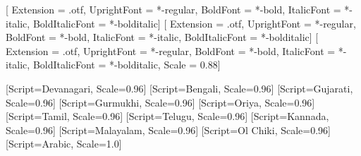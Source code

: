 
\usepackage[a4paper,
            left=1.25in, right=1.0in, top=0.75in, bottom=0.75in,
            includehead, includefoot, headsep=10pt, footskip=22pt]{geometry}

\usepackage{fontspec}

\setmainfont{texgyretermes}[
  Extension      = .otf,
  UprightFont    = *-regular,
  BoldFont       = *-bold,
  ItalicFont     = *-italic,
  BoldItalicFont = *-bolditalic]
\setsansfont{texgyreheros}[
  Extension      = .otf,
  UprightFont    = *-regular,
  BoldFont       = *-bold,
  ItalicFont     = *-italic,
  BoldItalicFont = *-bolditalic]
\setmonofont{texgyrecursor}[
  Extension      = .otf,
  UprightFont    = *-regular,
  BoldFont       = *-bold,
  ItalicFont     = *-italic,
  BoldItalicFont = *-bolditalic,
  Scale          = 0.88]

\newfontfamily{}[Script=Devanagari, Scale=0.96]
\newfontfamily{}[Script=Bengali, Scale=0.96]
\newfontfamily{}[Script=Gujarati, Scale=0.96]
\newfontfamily{}[Script=Gurmukhi, Scale=0.96]
\newfontfamily{}[Script=Oriya, Scale=0.96]
\newfontfamily{}[Script=Tamil, Scale=0.96]
\newfontfamily{}[Script=Telugu, Scale=0.96]
\newfontfamily{}[Script=Kannada, Scale=0.96]
\newfontfamily{}[Script=Malayalam, Scale=0.96]
\newfontfamily{}[Script=Ol Chiki, Scale=0.96]
\newfontfamily{}[Script=Arabic, Scale=1.0]

